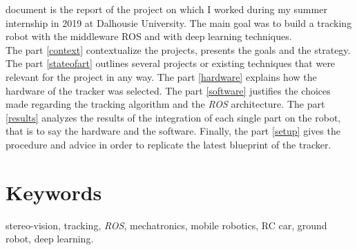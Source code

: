  document is the report of the project on which 
I worked during my summer internship in 2019 at Dalhousie 
University. The main goal was to build a tracking robot
with the middleware ROS and with deep learning techniques.
\\\indent The part \vref{context} contextualize the projects, 
presents the goals and the strategy. The part \vref{stateofart}
outlines several projects or existing techniques that 
were relevant for the project in any way. The part 
\vref{hardware} explains how the hardware of the 
tracker was selected. The part \vref{software}
justifies the choices made regarding the 
tracking algorithm and the \textit{ROS} architecture.
The part \vref{results} analyzes the results of the integration
of each single part on the robot, that is to say the hardware and 
the software. Finally, the part \vref{setup} gives the procedure 
and advice in order to replicate the latest blueprint
of the tracker.

\section*{Keywords} stereo-vision, tracking, \textit{ROS},
mechatronics, mobile robotics, RC car, ground robot, deep learning.



